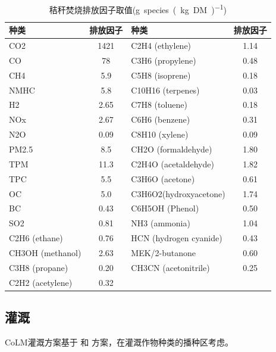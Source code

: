 \begin{table}[htbp]
  \centering
  \caption{秸秆焚烧排放因子取值(\unit{g.species.(kg.DM)^{-1}})}
  \label{tab:秸秆焚烧排放因子取值}
  \begin{tabular}{@{}lc|lc@{}}
    \toprule
    种类               & 排放因子 & 种类                   & 排放因子 \\ \midrule
    CO2                & 1421     & C2H4   (ethylene)      & 1.14     \\
    CO                 & 78       & C3H6   (propylene)     & 0.48     \\
    CH4                & 5.9      & C5H8   (isoprene)      & 0.18     \\
    NMHC               & 5.8      & C10H16   (terpenes)    & 0.03     \\
    H2                 & 2.65     & C7H8   (toluene)       & 0.18     \\
    NOx                & 2.67     & C6H6   (benzene)       & 0.31     \\
    N2O                & 0.09     & C8H10   (xylene)       & 0.09     \\
    PM2.5              & 8.5      & CH2O   (formaldehyde)  & 1.80     \\
    TPM                & 11.3     & C2H4O   (acetaldehyde) & 1.82     \\
    TPC                & 5.5      & C3H6O   (acetone)      & 0.61     \\
    OC                 & 5.0      & C3H6O2(hydroxyacetone) & 1.74     \\
    BC                 & 0.43     & C6H5OH   (Phenol)      & 0.50     \\
    SO2                & 0.81     & NH3 (ammonia)          & 1.04     \\
    C2H6   (ethane)    & 0.76     & HCN (hydrogen cyanide) & 0.43     \\
    CH3OH   (methanol) & 2.63     & MEK/2-butanone         & 0.60     \\
    C3H8   (propane)   & 0.20     & CH3CN   (acetonitrile) & 0.25     \\
    C2H2   (acetylene) & 0.32     &                        &          \\ \bottomrule
  \end{tabular}
\end{table}


\subsection{灌溉}
CoLM灌溉方案基于\citet{ozdogan2010simulating} 和 \citet{yao2022Irrigation}方案，在灌溉作物种类的播种区考虑。

